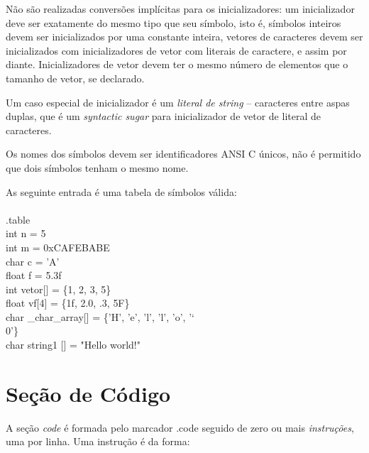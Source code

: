\documentclass[12pt,a4paper,extrafontsizes,article]{memoir}
\newcommand*{\srcfont}{\fontfamily{pcr}\selectfont}
\begin{document}
Não são realizadas conversões implícitas para os inicializadores: um inicializador deve ser exatamente do mesmo tipo que
seu símbolo, isto é, símbolos inteiros devem ser inicializados por uma constante inteira, vetores de caracteres devem
ser inicializados com inicializadores de vetor com literais de caractere, e assim por diante. Inicializadores de vetor
devem ter o mesmo número de elementos que o tamanho de vetor, se declarado.

Um caso especial de inicializador é um \textit{literal de string} -- caracteres entre aspas duplas, que é um
\textit{syntactic sugar} para inicializador de vetor de literal de caracteres.

Os nomes dos símbolos devem ser identificadores ANSI C únicos, não é permitido que dois símbolos tenham o mesmo nome.

As seguinte entrada é uma tabela de símbolos válida:\\

{\srcfont
{}\\
{\color{gray}.table}\\
{\color{blue}int} n = {\color{orange}5}\\
{\color{blue}int} m = {\color{orange}0xCAFEBABE}\\
{\color{blue}char} c = {\color{orange}'A'}\\
{\color{blue}float} f = {\color{orange}5.3f}\\
{\color{blue}int} vetor[] = \{{\color{orange}1}, {\color{orange}2}, {\color{orange}3}, {\color{orange}5}\}\\
{\color{blue}float} vf[4] = \{{\color{orange}1f}, {\color{orange}2.0}, {\color{orange}.3}, {\color{orange}5F}\}\\
{\color{blue}char} \_char\_array[] = \{{\color{orange}'H'}, {\color{orange}'e'}, {\color{orange}'l'},
{\color{orange}'l'}, {\color{orange}'o'}, {\color{orange}'\char`\\0'}\}\\
{\color{blue}char} string1 [] = {\color{orange}"Hello world!"}
}

\section{Seção de Código}

A seção \textit{code} é formada pelo marcador {\srcfont .code} seguido de zero ou mais \textit{instruções}, uma por
linha. Uma instrução é da forma:
\end{document}
